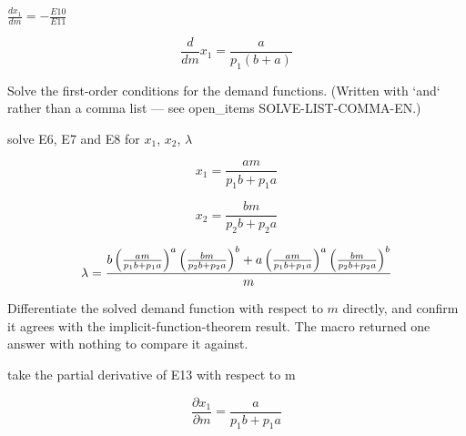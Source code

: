 \documentclass[dvipdfmx]{article}
\begin{document}
$\frac{dx_1}{dm} = -\frac{E10}{E11}$

\begin{equation}
  \frac{d}{d m} x_{1}=\frac{a}{p_{1} \left(b+a\right)}
  \label{eq:E12}
\end{equation}

Solve the first-order conditions for the demand functions. (Written with `and` rather than a comma list — see open\_items SOLVE-LIST-COMMA-EN.)

solve E6, E7 and E8 for $x_1$, $x_2$, $\lambda$

\begin{equation}
  x_{1} = \frac{a m}{p_{1} b+p_{1} a}
  \label{eq:E13}
\end{equation}

\begin{equation}
  x_{2} = \frac{b m}{p_{2} b+p_{2} a}
  \label{eq:E14}
\end{equation}

\begin{equation}
  \lambda = {{b \left(\frac{a m}{p_{1} b+p_{1} a}\right)^{a} \left(\frac{b m}{p_{2} b+p_{2} a}\right)^{b}+a \left(\frac{a m}{p_{1} b+p_{1} a}\right)^{a} \left(\frac{b m}{p_{2} b+p_{2} a}\right)^{b}}\over{m}}
  \label{eq:E15}
\end{equation}

Differentiate the solved demand function with respect to $m$ directly, and confirm it agrees with the implicit-function-theorem result. The macro returned one answer with nothing to compare it against.

take the partial derivative of E13 with respect to m

\begin{equation}
  \frac{\partial x_1}{\partial m} = \frac{a}{p_{1} b+p_{1} a}
  \label{eq:E16}
\end{equation}
\end{document}

